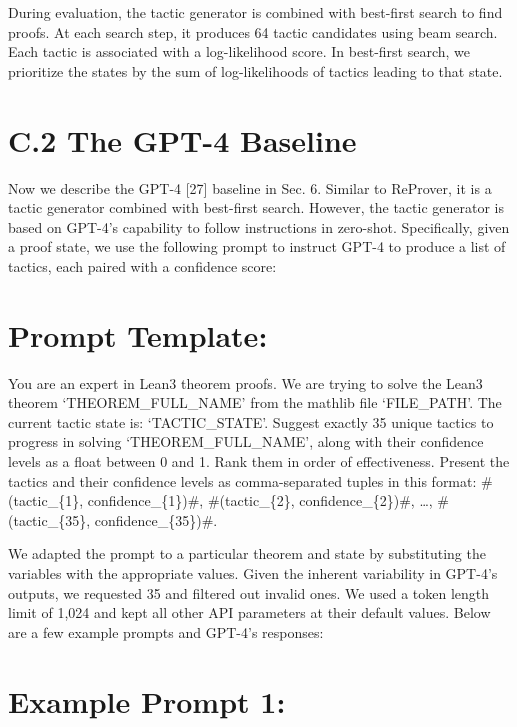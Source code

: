 \documentclass[
]{article}
\begin{document}
During evaluation, the tactic generator is combined with best-first
search to find proofs. At each search step, it produces 64 tactic
candidates using beam search. Each tactic is associated with a
log-likelihood score. In best-first search, we prioritize the states by
the sum of log-likelihoods of tactics leading to that state.

\section{C.2 The GPT-4 Baseline}\label{c.2-the-gpt-4-baseline}

Now we describe the GPT-4 {[}27{]} baseline in Sec. 6. Similar to
ReProver, it is a tactic generator combined with best-first search.
However, the tactic generator is based on GPT-4's capability to follow
instructions in zero-shot. Specifically, given a proof state, we use the
following prompt to instruct GPT-4 to produce a list of tactics, each
paired with a confidence score:

\section{Prompt Template:}\label{prompt-template}

You are an expert in Lean3 theorem proofs. We are trying to solve the
Lean3 theorem `THEOREM\_FULL\_NAME' from the mathlib file `FILE\_PATH'.
The current tactic state is: `TACTIC\_STATE'. Suggest exactly 35 unique
tactics to progress in solving `THEOREM\_FULL\_NAME', along with their
confidence levels as a float between 0 and 1. Rank them in order of
effectiveness. Present the tactics and their confidence levels as
comma-separated tuples in this format: \#(tactic\_\{1\},
confidence\_\{1\})\#, \#(tactic\_\{2\}, confidence\_\{2\})\#, \ldots,
\#(tactic\_\{35\}, confidence\_\{35\})\#.

We adapted the prompt to a particular theorem and state by substituting
the variables with the appropriate values. Given the inherent
variability in GPT-4's outputs, we requested 35 and filtered out invalid
ones. We used a token length limit of 1,024 and kept all other API
parameters at their default values. Below are a few example prompts and
GPT-4's responses:

\section{Example Prompt 1:}\label{example-prompt-1}
\end{document}
